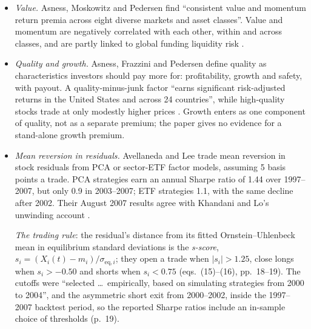 \begin{qfdefinition}
\begin{itemize}
Regressed on value, momentum and time-series momentum factors, carry keeps a significant alpha in every class. Equity carry loads positively on value without much loss of alpha. Commodity carry loads negatively on value and positively on momentum, and its alpha falls by 29 to 64 basis points a month, still significant. Currency and credit carry show no reliable loading (Table~IV discussion, pp.~23--24). So Narang's ``carry trade'' for relative value is a distinct signal from value, though correlated with it in places.
\item \emph{Value.} Asness, Moskowitz and Pedersen find ``consistent value and momentum return premia across eight diverse markets and asset classes''. Value and momentum are negatively correlated with each other, within and across classes, and are partly linked to global funding liquidity risk \citep[abstract, p.~929]{alpha-value}.
\item \emph{Quality and growth.} Asness, Frazzini and Pedersen define quality as characteristics investors should pay more for: profitability, growth and safety, with payout. A quality-minus-junk factor ``earns significant risk-adjusted returns in the United States and across 24 countries'', while high-quality stocks trade at only modestly higher prices \citep[published version, abstract, p.~34]{alpha-qmj}. Growth enters as one component of quality, not as a separate premium; the paper gives no evidence for a stand-alone growth premium.
\item \emph{Mean reversion in residuals.} Avellaneda and Lee trade mean reversion in stock residuals from PCA or sector-ETF factor models, assuming 5 basis points a trade. PCA strategies earn an annual Sharpe ratio of 1.44 over 1997--2007, but only 0.9 in 2003--2007; ETF strategies 1.1, with the same decline after 2002. Their August 2007 results agree with Khandani and Lo's unwinding account \citep[version of 15 June 2009, abstract and sec.~1, pp.~1 and~4]{alpha-residual}.

\emph{The trading rule}: the residual's distance from its fitted Ornstein--Uhlenbeck mean in equilibrium standard deviations is the \emph{s-score}, $s_i=(X_i(t)-m_i)/\sigma_{\mathrm{eq},i}$; they open a trade when $|s_i|>1.25$, close longs when $s_i>-0.50$ and shorts when $s_i<0.75$ (eqs.~(15)--(16), pp.~18--19). The cutoffs were ``selected \dots\ empirically, based on simulating strategies from 2000 to 2004'', and the asymmetric short exit from 2000--2002, inside the 1997--2007 backtest period, so the reported Sharpe ratios include an in-sample choice of thresholds (p.~19).


\end{itemize}
\end{qfdefinition}
